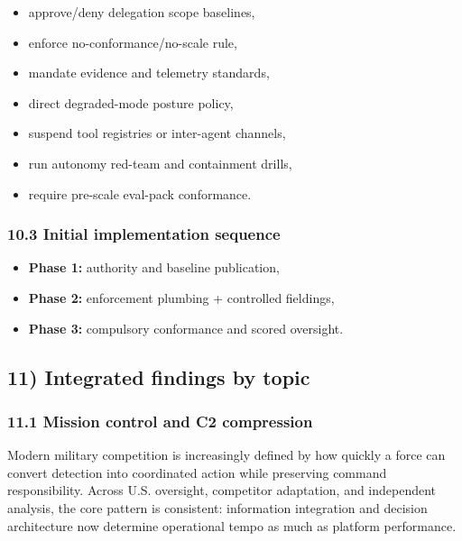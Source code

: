 \documentclass[11pt]{article}
\begin{document}
\begin{itemize}
\tightlist
\item
  approve/deny delegation scope baselines,
\item
  enforce no-conformance/no-scale rule,
\item
  mandate evidence and telemetry standards,
\item
  direct degraded-mode posture policy,
\item
  suspend tool registries or inter-agent channels,
\item
  run autonomy red-team and containment drills,
\item
  require pre-scale eval-pack conformance.
\end{itemize}

\hypertarget{initial-implementation-sequence}{%
\subsubsection{10.3 Initial implementation
sequence}\label{initial-implementation-sequence}}

\begin{itemize}
\tightlist
\item
  \textbf{Phase 1:} authority and baseline publication,
\item
  \textbf{Phase 2:} enforcement plumbing + controlled fieldings,
\item
  \textbf{Phase 3:} compulsory conformance and scored oversight.
\end{itemize}

\hypertarget{integrated-findings-by-topic}{%
\subsection{11) Integrated findings by
topic}\label{integrated-findings-by-topic}}

\hypertarget{mission-control-and-c2-compression}{%
\subsubsection{11.1 Mission control and C2
compression}\label{mission-control-and-c2-compression}}

Modern military competition is increasingly defined by how quickly a
force can convert detection into coordinated action while preserving
command responsibility. Across U.S. oversight, competitor adaptation,
and independent analysis, the core pattern is consistent: information
integration and decision architecture now determine operational tempo as
much as platform performance.
\end{document}
